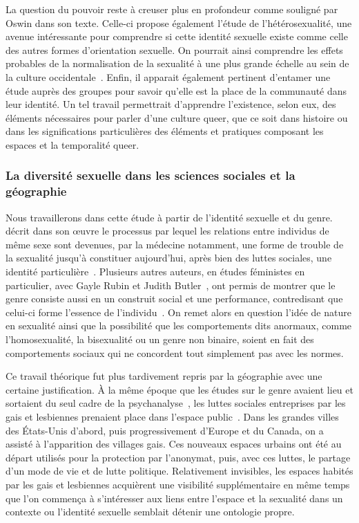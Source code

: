 La question du pouvoir reste à creuser plus en profondeur comme souligné par Oswin dans son texte.
Celle-ci propose également l'étude de l'hétérosexualité, une avenue intéressante pour comprendre si cette identité sexuelle existe comme celle des autres formes d'orientation sexuelle.
On pourrait ainsi comprendre les effets probables de la normalisation de la sexualité à une plus grande échelle au sein de la culture occidentale~\citep[100]{Oswin2008}.
Enfin, il apparait également pertinent d’entamer une étude auprès des groupes \lgbt{} pour savoir qu'elle est la place de la communauté dans leur identité.
Un tel travail permettrait d'apprendre l'existence, selon eux, des éléments nécessaires pour parler d'une culture queer, que ce soit dans histoire ou dans les significations particulières des éléments et pratiques composant les espaces et la temporalité queer.

\subsubsection{La diversité sexuelle dans les sciences sociales et la géographie}
\label{ssub:la_diversit_sexuelle_dans_les_sciences_sociales_et_la_g_ographie}
Nous travaillerons dans cette étude à partir de l'identité sexuelle et du genre.
\citet{Foucault2011} décrit dans son œuvre  le processus par lequel les relations entre individus de même sexe sont devenues, par la médecine notamment, une forme de trouble de la sexualité jusqu'à constituer aujourd'hui, après bien des luttes sociales, une identité particulière~\citep{Foucault2011}.
Plusieurs autres auteurs, en études féministes en particulier, avec Gayle Rubin et Judith Butler~\citep[98]{Marcus2005}, ont permis de montrer que le genre consiste aussi en un construit social et une performance, contredisant que celui-ci forme l'essence de l'individu~\citep{Butler2007}.
On remet alors en question l'idée de nature en sexualité ainsi que la possibilité que les comportements dits anormaux, comme l'homosexualité, la bisexualité ou un genre non binaire, soient en fait des comportements sociaux qui ne concordent tout simplement pas avec les normes.

Ce travail théorique fut plus tardivement repris par la géographie avec une certaine justification.
À la même époque que les études sur le genre avaient lieu et sortaient du seul cadre de la psychanalyse~\citep{Rubin2011a,Rubin2011}, les luttes sociales entreprises par les gais et lesbiennes prenaient place dans l'espace public~\citep[422-427]{Spencer2005}.
Dans les grandes villes des États-Unis d'abord, puis progressivement d'Europe et du Canada, on a assisté à l'apparition des villages gais.
Ces nouveaux espaces urbains ont été au départ utilisés pour la protection par l'anonymat, puis, avec ces luttes, le partage d'un mode de vie et de lutte politique.
Relativement invisibles, les espaces  habités par les gais et lesbiennes acquièrent une visibilité supplémentaire en même temps que l'on commença à s'intéresser aux liens entre l'espace et la sexualité dans un contexte ou l'identité sexuelle semblait détenir une ontologie propre.

